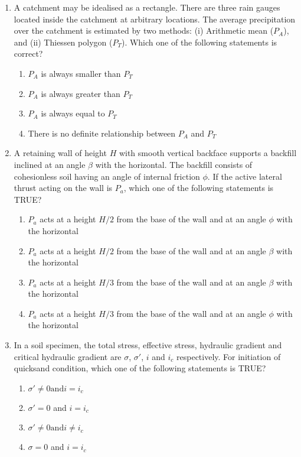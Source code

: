 \documentclass[12pt]{article}
\begin{document}
\begin{enumerate}[label=Q.\arabic*]
	\item A catchment may be idealised as a rectangle. There are three rain gauges located inside the catchment at arbitrary locations. The average precipitation over the catchment is estimated by two methods: (i) Arithmetic mean ($P_A$), and (ii) Thiessen polygon ($P_T$). Which one of the following statements is correct?  
		\begin{enumerate}[label=(\Alph*)]
			\item $P_A$ is always smaller than $P_T$  
			\item $P_A$ is always greater than $P_T$  
			\item $P_A$ is always equal to $P_T$  
			\item There is no definite relationship between $P_A$ and $P_T$  
		\end{enumerate}
	\item A retaining wall of height $H$ with smooth vertical backface supports a backfill inclined at an angle $\beta$ with the horizontal. The backfill consists of cohesionless soil having an angle of internal friction $\phi$. If the active lateral thrust acting on the wall is $P_a$, which one of the following statements is TRUE?
		\begin{enumerate}[label=(\Alph*)]
			\item $P_a$ acts at a height $H/2$ from the base of the wall and at an angle $\phi$ with the horizontal  
			\item $P_a$ acts at a height $H/2$ from the base of the wall and at an angle $\beta$ with the horizontal  
			\item $P_a$ acts at a height $H/3$ from the base of the wall and at an angle $\beta$ with the horizontal  
			\item $P_a$ acts at a height $H/3$ from the base of the wall and at an angle $\phi$ with the horizontal  
		\end{enumerate}

	\item In a soil specimen, the total stress, effective stress, hydraulic gradient and critical hydraulic gradient are $\sigma$, $\sigma'$, $i$ and $i_c$ respectively. For initiation of quicksand condition, which one of the following statements is TRUE?
		\begin{multicols}{2}
			\begin{enumerate}[label=(\Alph*)]
				\item $\sigma'\neq 0 \text{and} i = i_c$  
				\item $\sigma' = 0$ and $i = i_c$  
				\item $\sigma' \neq 0 \text{and}   i \neq i_c$  
				\item $\sigma = 0$ and $i = i_c$  
			\end{enumerate}
		\end{multicols}


\end{enumerate}
\end{document}
